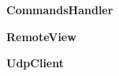 \documentclass[struktura.tex]{subfiles}
\begin{document}
\textbf{CommandsHandler}

\textbf{RemoteView}

\textbf{UdpClient}
\end{document}

